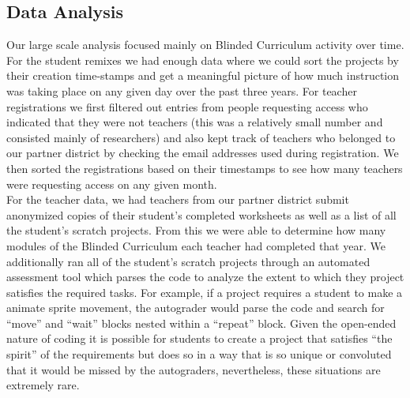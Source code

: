\documentclass[sigconf,manuscript,review,anonymous]{acmart} %
\def\ts{TIPP\&SEE}
\newcommand{\Scratchencore}[0]{Blinded Curriculum}
\begin{document}
\subsection{Data Analysis}

Our large scale analysis focused mainly on \Scratchencore{} activity over time. For the
student remixes we had enough data where we could sort the projects by their creation
time-stamps and get a meaningful picture of how much instruction was taking place on
any given day over the past three years. For teacher registrations we first filtered out entries
from people requesting access who indicated that they were not teachers (this was a relatively small number
and consisted mainly of researchers) and also kept track of teachers who belonged to
our partner district by checking the email addresses used during registration. We then sorted the registrations based on their timestamps
to see how many teachers were requesting access on any given month.\\
  For the teacher data, we had teachers from our partner district submit anonymized copies
of  their student's completed worksheets as well as a list of all the student's scratch projects.
From this we were able to determine how many modules of the \Scratchencore{} each
teacher had completed that year. We additionally ran all of the student's scratch projects 
through an automated assessment tool which parses the code to analyze the extent to which
they project satisfies the required tasks. For example, if a project requires a student to
make a animate sprite movement, the autograder would parse the code and search for
``move'' and ``wait'' blocks nested within a “repeat” block. Given the open-ended nature
of coding it is possible for students to create a project that satisfies ``the spirit'' of the
requirements but does so in a way that is so unique or convoluted that it would be missed 
by the autograders, nevertheless, these situations are extremely rare.
\end{document}
